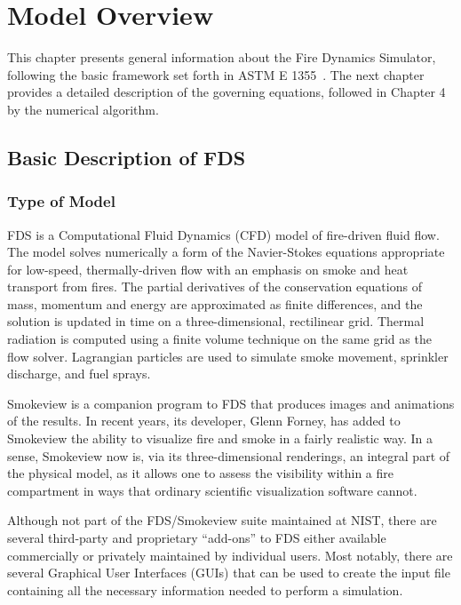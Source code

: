 \documentclass[11pt]{book}
\begin{document}
\chapter{Model Overview}

This chapter presents general information about the Fire Dynamics Simulator, following the basic framework set forth in
ASTM E 1355~\cite{ASTM:E1355}. The next chapter provides a detailed description of the governing equations, followed in
Chapter 4 by the numerical algorithm.


\section{Basic Description of FDS}


\subsection{Type of Model}

FDS is a Computational Fluid Dynamics (CFD) model of fire-driven fluid flow.
The model solves numerically a form of the Navier-Stokes equations appropriate
for low-speed, thermally-driven flow with an emphasis on smoke and heat transport
from fires. The partial derivatives of the conservation equations of mass, momentum and energy are approximated
as finite differences, and the solution is updated in time on a three-dimensional, rectilinear grid.
Thermal radiation is computed using a finite volume technique on the same grid as the flow solver.
Lagrangian particles are used to simulate smoke movement, sprinkler discharge, and fuel sprays.

Smokeview is a companion program to FDS that produces images and animations of the results. In recent years, its developer, Glenn Forney, has
added to Smokeview the ability to visualize fire and smoke in a fairly realistic way. In a sense, Smokeview now is, via its three-dimensional
renderings, an integral part of the physical model, as it allows one to assess the visibility within a fire compartment in ways that ordinary
scientific visualization software cannot.

Although not part of the FDS/Smokeview suite maintained at NIST, there are several third-party and proprietary ``add-ons'' to FDS either available
commercially or privately maintained by individual users. Most notably, there are several Graphical User Interfaces (GUIs) that can be used
to create the input file containing all the necessary information needed to perform a simulation.
\end{document}
